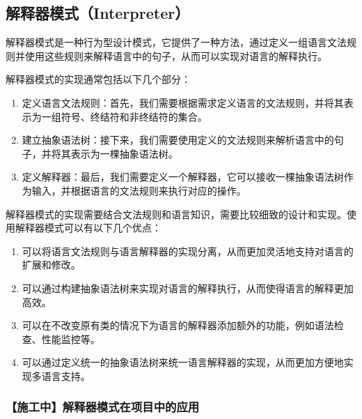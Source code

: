 \subsection{解释器模式（Interpreter）}

解释器模式是一种行为型设计模式，它提供了一种方法，通过定义一组语言文法规则并使用这些规则来解释语言中的句子，从而可以实现对语言的解释执行。

解释器模式的实现通常包括以下几个部分：
\begin{enumerate}
    \item 定义语言文法规则：首先，我们需要根据需求定义语言的文法规则，并将其表示为一组符号、终结符和非终结符的集合。
    \item 建立抽象语法树：接下来，我们需要使用定义的文法规则来解析语言中的句子，并将其表示为一棵抽象语法树。
    \item 定义解释器：最后，我们需要定义一个解释器，它可以接收一棵抽象语法树作为输入，并根据语言的文法规则来执行对应的操作。
\end{enumerate}

解释器模式的实现需要结合文法规则和语言知识，需要比较细致的设计和实现。使用解释器模式可以有以下几个优点：

\begin{enumerate}
    \item 可以将语言文法规则与语言解释器的实现分离，从而更加灵活地支持对语言的扩展和修改。
    \item 可以通过构建抽象语法树来实现对语言的解释执行，从而使得语言的解释更加高效。
    \item 可以在不改变原有类的情况下为语言的解释器添加额外的功能，例如语法检查、性能监控等。
    \item 可以通过定义统一的抽象语法树来统一语言解释器的实现，从而更加方便地实现多语言支持。
\end{enumerate}

\subsubsection{【施工中】解释器模式在项目中的应用}

